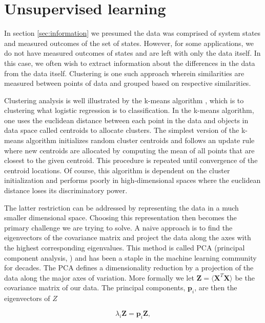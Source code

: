 \section{Unsupervised learning}\label{sec:unsupervised_learning}

In section \ref{sec:information} we presumed the data was comprised of system states and measured outcomes of the set of states. However, for some applications, we do not have measured outcomes of states and are left with only the data itself. In this case, we often wish to extract information about the differences in the data from the data itself. Clustering is one such approach wherein similarities are measured between points of data and grouped based on respective similarities.

Clustering analysis is well illustrated by the k-means algorithm \cite{Neyman1967}, which is to clustering what logistic regression is to classification.  In the k-means algorithm, one uses the euclidean distance between each point in the data and objects in data space called centroids to allocate clusters. The simplest version of the k-means algorithm initializes random cluster centroids and follows an update rule where new centroids are allocated by computing the mean of all points that are closest to the given centroid. This procedure is repeated until convergence of the centroid locations. Of course, this algorithm is dependent on the cluster initialization and performs poorly in high-dimensional spaces where the euclidean distance loses its discriminatory power. 

The latter restriction can be addressed by representing the data in a much smaller dimensional space. Choosing this representation then becomes the primary challenge we are trying to solve. A naive approach is to find the eigenvectors of the covariance matrix and project the data along the axes with the highest corresponding eigenvalues. This method is called PCA (principal component analysis, \cite{Marsland2009}) and has been a staple in the machine learning community for decades. The PCA defines a dimensionality reduction by a projection of the data along the major axes of variation. More formally we let $\boldsymbol{Z} = \langle \boldsymbol{X}^T\boldsymbol{X}\rangle$ be the covariance matrix of our data. The principal components, $\boldsymbol{p}_i$, are then the eigenvectors of $Z$ 

\begin{equation}\label{eq:pca}
\lambda_i \boldsymbol{Z} = \boldsymbol{p}_i \boldsymbol{Z},
\end{equation}

